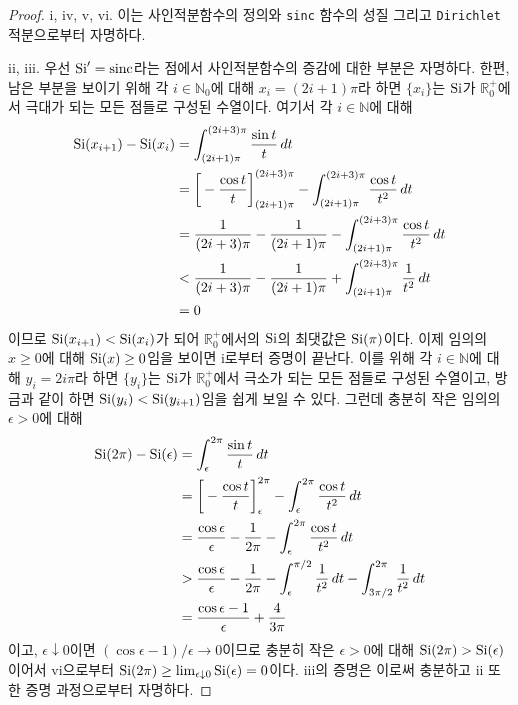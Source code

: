 \begin{proof}
    i, iv, v, vi. 이는 사인적분함수의 정의와 \texttt{sinc} 함수의 성질 그리고 \texttt{Dirichlet} 적분으로부터 자명하다.

    ii, iii. 우선 $\mathrm{Si}'=\mathrm{sinc}$라는 점에서 사인적분함수의 증감에 대한 부분은 자명하다. 한편, 남은 부분을 보이기 위해 각 $i\in\mathbb{N}_0$에 대해 $x_i=(2i+1)\pi$라 하면 $\{x_i\}$는 $\mathrm{Si}$가 $\mathbb{R}^+_0$에서 극대가 되는 모든 점들로 구성된 수열이다. 여기서 각 $i\in\mathbb{N}$에 대해 
    \begin{align*}
        \mathrm{Si}(x_{i+1})-\mathrm{Si}(x_i)&=\int_{(2i+1)\pi}^{(2i+3)\pi}\frac{\sin t}{t}\,dt\\
        &=\bigg[-\frac{\cos t}{t}\bigg]_{(2i+1)\pi}^{(2i+3)\pi}-\int_{(2i+1)\pi}^{(2i+3)\pi}\frac{\cos t}{t^2}\,dt\\
        &=\frac{1}{(2i+3)\pi}-\frac{1}{(2i+1)\pi}-\int_{(2i+1)\pi}^{(2i+3)\pi}\frac{\cos t}{t^2}\,dt\\
        &<\frac{1}{(2i+3)\pi}-\frac{1}{(2i+1)\pi}+\int_{(2i+1)\pi}^{(2i+3)\pi}\frac{1}{t^2}\,dt\\
        &=0
    \end{align*}
    이므로 $\mathrm{Si}(x_{i+1})<\mathrm{Si}(x_i)$가 되어 $\mathbb{R}^+_0$에서의 $\mathrm{Si}$의 최댓값은 $\mathrm{Si}(\pi)$이다. 이제 임의의 $x\geq0$에 대해 $\mathrm{Si}(x)\geq0$임을 보이면 i로부터 증명이 끝난다. 이를 위해 각 $i\in\mathbb{N}$에 대해 $y_i=2i\pi$라 하면 $\{y_i\}$는 $\mathrm{Si}$가 $\mathbb{R}^+_0$에서 극소가 되는 모든 점들로 구성된 수열이고, 방금과 같이 하면 $\mathrm{Si}(y_i)<\mathrm{Si}(y_{i+1})$임을 쉽게 보일 수 있다. 그런데 충분히 작은 임의의 $\epsilon>0$에 대해
    \begin{align*}
        \mathrm{Si}(2\pi)-\mathrm{Si}(\epsilon)&=\int_{\epsilon}^{2\pi}\frac{\sin t}{t}\,dt\\
        &=\bigg[-\frac{\cos t}{t}\bigg]_{\epsilon}^{2\pi}-\int_{\epsilon}^{2\pi}\frac{\cos t}{t^2}\,dt\\
        &=\frac{\cos\epsilon}{\epsilon}-\frac{1}{2\pi}-\int_{\epsilon}^{2\pi}\frac{\cos t}{t^2}\,dt\\
        &>\frac{\cos\epsilon}{\epsilon}-\frac{1}{2\pi}-\int_{\epsilon}^{\pi/2}\frac{1}{t^2}\,dt-\int_{3\pi/2}^{2\pi}\frac{1}{t^2}\,dt\\
        &=\frac{\cos\epsilon-1}{\epsilon}+\frac{4}{3\pi}
    \end{align*}
    이고, $\epsilon\downarrow0$이면 $(\cos\epsilon-1)/\epsilon\to0$이므로 충분히 작은 $\epsilon>0$에 대해 $\mathrm{Si}(2\pi)>\mathrm{Si}(\epsilon)$이어서 vi으로부터 $\mathrm{Si}(2\pi)\geq\lim_{\epsilon\downarrow0}\mathrm{Si}(\epsilon)=0$이다. iii의 증명은 이로써 충분하고 ii 또한 증명 과정으로부터 자명하다.
\end{proof}

